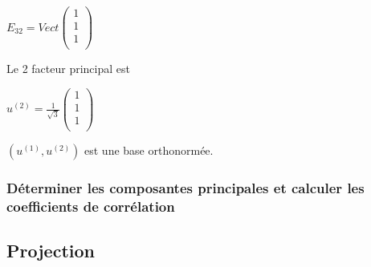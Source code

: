 \documentclass[a4paper, 12pt]{article}
\begin{document}
\begin{center}
$
E_{32} = Vect
\begin{pmatrix}
1 \\
1 \\
1 \\
\end{pmatrix}
$
\end{center}

\begin{flushleft}
Le 2 facteur principal est
\end{flushleft}

\begin{center}
$
u^{(2)} = \frac{1}{\sqrt{3}}
\begin{pmatrix}
1 \\
1 \\
1 \\
\end{pmatrix}
$
\end{center}

\begin{flushleft}
$(u^{(1)}, u^{(2)})$ est une base orthonormée.
\end{flushleft}


\subsubsection{Déterminer les composantes principales et calculer les coefficients de corrélation}









\subsection{Projection}
\end{document}
